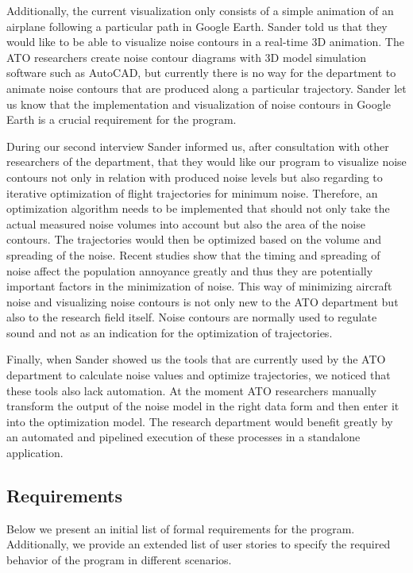 Additionally, the current visualization only consists of a simple animation of an airplane following a particular path in Google Earth. Sander told us that they would like to be able to visualize noise contours in a real-time 3D animation. The ATO researchers create noise contour diagrams with 3D model simulation software such as AutoCAD, but currently there is no way for the department to animate noise contours that are produced along a particular trajectory. Sander let us know that the implementation and visualization of noise contours in Google Earth is a crucial requirement for the program.

During our second interview Sander informed us, after consultation with other researchers of the department, that they would like our program to visualize noise contours not only in relation with produced noise levels but also regarding to iterative optimization of flight trajectories for minimum noise. Therefore, an optimization algorithm needs to be implemented that should not only take the actual measured noise volumes into account but also the area of the noise contours. The trajectories would then be optimized based on the volume and spreading of the noise. Recent studies show that the timing and spreading of noise affect the population annoyance greatly and thus they are potentially important factors in the minimization of noise. This way of minimizing aircraft noise and visualizing noise contours is not only new to the ATO department but also to the research field itself. Noise contours are normally used to regulate sound and not as an indication for the optimization of trajectories.

Finally, when Sander showed us the tools that are currently used by the ATO department to calculate noise values and optimize trajectories, we noticed that these tools also lack automation. At the moment ATO researchers manually transform the output of the noise model in the right data form and then enter it into the optimization model. The research department would benefit greatly by an automated and pipelined execution of these processes in a standalone application. 

\subsection{Requirements}
Below we present an initial list of formal requirements for the program. Additionally, we provide an extended list of user stories to specify the required behavior of the program in different scenarios.


